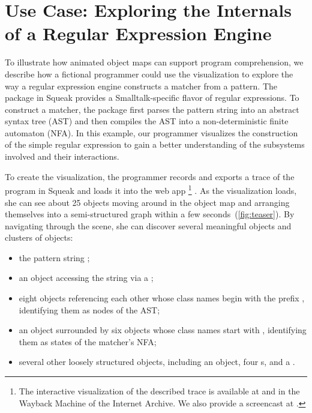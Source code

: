 \section{Use Case: Exploring the Internals of a Regular Expression Engine}
\label{sec:use_case}

To illustrate how animated object maps can support program comprehension, we describe how a fictional programmer could use the \tfd{} visualization to explore the way a regular expression engine constructs a matcher from a pattern.
The  package in Squeak provides a Smalltalk-specific flavor of regular expressions.
To construct a matcher, the package first parses the pattern string into an abstract syntax tree (AST) and then compiles the AST into a non-deterministic finite automaton (NFA).
In this example, our programmer visualizes the construction of the simple regular expression  to gain a better understanding of the subsystems involved and their interactions.

To create the visualization, the programmer records and exports a trace of the program  in Squeak and loads it into the \tfd{} web app%
\footnote{
	The interactive visualization of the described trace is available at  and in the Wayback Machine of the Internet Archive.
	We also provide a screencast at .
}%
.
As the visualization loads, she can see about 25 objects moving around in the object map and arranging themselves into a semi-structured graph within a few seconds~(\cref{fig:teaser}).
By navigating through the scene, she can discover several meaningful objects and clusters of objects:

\begin{itemize}
	\item the pattern string ;
	\item an  object accessing the string via a ;
	\item eight objects referencing each other whose class names begin with the prefix , identifying them as nodes of the AST;
	\item an  object surrounded by six objects whose class names start with , identifying them as states of the matcher's NFA;
	\item several other loosely structured objects, including an  object, four s, and a .
\end{itemize}

